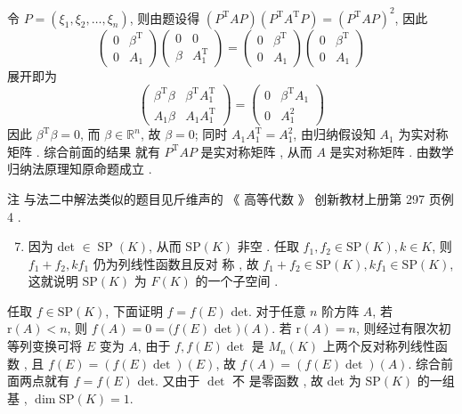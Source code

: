 \documentclass[10pt]{article}
\begin{document}
 令  $P=\left(\xi_{1}, \xi_{2}, \ldots, \xi_{n}\right)$,  则由题设得  $\left(P^{\mathrm{T}} A P\right)\left(P^{\mathrm{T}} A^{\mathrm{T}} P\right)=\left(P^{\mathrm{T}} A P\right)^{2}$,  因此 
$$
\left(\begin{array}{ll}
0 & \beta^{\mathrm{T}} \\
0 & A_{1}
\end{array}\right)\left(\begin{array}{cc}
0 & 0 \\
\beta & A_{1}^{\mathrm{T}}
\end{array}\right)=\left(\begin{array}{cc}
0 & \beta^{\mathrm{T}} \\
0 & A_{1}
\end{array}\right)\left(\begin{array}{ll}
0 & \beta^{\mathrm{T}} \\
0 & A_{1}
\end{array}\right)
$$
 展开即为 
$$
\left(\begin{array}{cc}
\beta^{\mathrm{T}} \beta & \beta^{\mathrm{T}} A_{1}^{\mathrm{T}} \\
A_{1} \beta & A_{1} A_{1}^{\mathrm{T}}
\end{array}\right)=\left(\begin{array}{cc}
0 & \beta^{\mathrm{T}} A_{1} \\
0 & A_{1}^{2}
\end{array}\right)
$$
 因此  $\beta^{\mathrm{T}} \beta=0$,  而  $\beta \in \mathbb{R}^{n}$,  故  $\beta=0$;  同时  $A_{1} A_{1}^{\mathrm{T}}=A_{1}^{2}$,  由归纳假设知  $A_{1}$  为实对称矩阵 .  综合前面的结果   就有  $P^{\mathrm{T}} A P$  是实对称矩阵 ,  从而  $A$  是实对称矩阵 .  由数学归纳法原理知原命题成立 .

 注   与法二中解法类似的题目见斤维声的 《 高等代数 》 创新教材上册第  297  页例  4 .

\begin{enumerate}
  \setcounter{enumi}{6}
  \item  因为  det $\in \operatorname{SP}(K)$,  从而  $\mathrm{SP}(K)$  非空 .  任取  $f_{1}, f_{2} \in \mathrm{SP}(K), k \in K$,  则  $f_{1}+f_{2}, k f_{1}$  仍为列线性函数且反对   称 ,  故  $f_{1}+f_{2} \in \mathrm{SP}(K), k f_{1} \in \mathrm{SP}(K)$,  这就说明  $\mathrm{SP}(K)$  为  $F(K)$  的一个子空间 .
\end{enumerate}
 任取  $f \in \mathrm{SP}(K)$,  下面证明  $f=f(E)$ det.  对于任意  $n$  阶方阵  $A$,  若  $\mathrm{r}(A)<n$,  则  $f(A)=0=(f(E)$ det $)(A)$.  若  $\mathrm{r}(A)=n$,  则经过有限次初等列变换可将  $E$  变为  $A$,  由于  $f, f(E) \operatorname{det}$  是  $M_{n}(K)$  上两个反对称列线性函   数 ,  且  $f(E)=(f(E) \operatorname{det})(E)$,  故  $f(A)=(f(E) \operatorname{det})(A)$.  综合前面两点就有  $f=f(E)$ det.  又由于  $\operatorname{det}$  不   是零函数 ,  故  det  为  $\mathrm{SP}(K)$  的一组基 , $\operatorname{dim} \mathrm{SP}(K)=1$.
\end{document}
